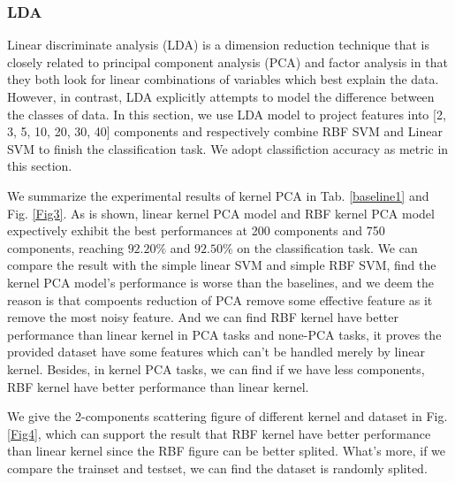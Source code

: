 \documentclass{article}
\begin{document}
\subsubsection{LDA}

Linear discriminate analysis (LDA) is a dimension reduction technique that is closely related to principal component analysis (PCA) and factor analysis in that they both look for linear combinations of variables which best explain the data. However, in contrast, LDA explicitly attempts to model the difference between the classes of data. In this section, we use LDA model to project features into [2, 3, 5, 10, 20, 30, 40] components and respectively combine RBF SVM and Linear SVM to finish the classification task. We adopt classifiction accuracy as metric in this section.

We summarize the experimental results of kernel PCA in Tab. \ref{baseline1} and Fig. \ref{Fig3}. As is shown, linear kernel PCA model and RBF kernel PCA model expectively exhibit the best performances at 200 components and 750 components, reaching $92.20\%$ and $92.50\%$ on the classification task. We can compare the result with the simple linear SVM and simple RBF SVM, find the kernel PCA model's performance is worse than the baselines, and we deem the reason is that compoents reduction of PCA remove some effective feature as it remove the most noisy feature. And we can find RBF kernel have better performance than linear kernel in PCA tasks and none-PCA tasks, it proves the provided dataset have some features which can't be handled merely by linear kernel. Besides, in kernel PCA tasks, we can find if we have less components, RBF kernel have better performance than linear kernel.

We give the 2-components scattering figure of different kernel and dataset in Fig. \ref{Fig4}, which can support the result that RBF kernel have better performance than linear kernel since the RBF figure can be better splited. What's more, if we compare the trainset and testset, we can find the dataset is randomly splited.
\end{document}
